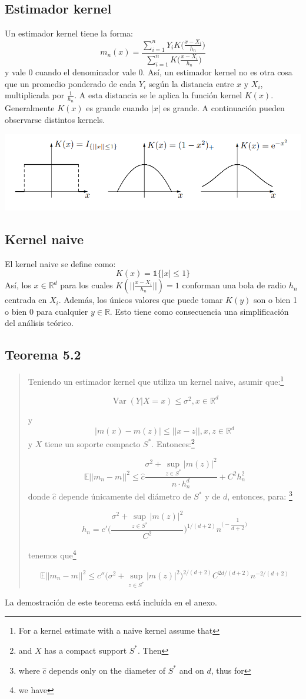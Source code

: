 \documentclass[12pt, a4paper]{article}
\begin{document}
\subsection{Estimador kernel}
Un estimador kernel tiene la forma:
$$
m_n(x)=\frac{\sum_{i=1}^{n} Y_i K \big( \frac{x-X_i}{h_n} \big)}{\sum_{i=1}^{n} K \big( \frac{x-X_i}{h_n} \big)}
$$
y vale 0 cuando el denominador vale 0. Así, un estimador kernel no es otra cosa que un promedio ponderado de cada $Y_i$ según la distancia entre $x$ y $X_i$, multiplicada por $\frac{1}{h_n}$. A esta distancia se le aplica la función kernel $K(x)$. Generalmente $K(x)$ es grande cuando $|x|$ es grande. A continuación pueden observarse distintos kernels.

\includegraphics[width=\textwidth]{graficos_kernel}
\subsection{Kernel naive}
El kernel naive se define como:
$$
K(x)=\mathds{1}\{ |x|\leq1 \}
$$
Así, los $x\in\mathds{R}^d$ para los cuales $K(||\frac{x-X_i}{h_n}||)=1$ conforman una bola de radio $h_n$ centrada en $X_i$. Además, los únicos valores que puede tomar $K(y)$ son o bien 1 o bien 0 para cualquier $y\in\mathds{R}$. Esto tiene como consecuencia una simplificación del análisis teórico.
\subsection{Teorema 5.2}

\begin{quotation}
Teniendo un estimador kernel que utiliza un kernel naive, asumir que:\footnote{For a kernel estimate with a naive kernel assume that}

$$
\mathop{Var}(Y|X=x)\leq \sigma^2 ,x \in \mathds{R}^d
$$

y
$$
|m(x)-m(z)|\leq||x-z||, x,z \in \mathds{R}^d
$$
y $X$ tiene un soporte compacto $S^{*}$. Entonces:\footnote{and $X$ has a compact support $S^{*}$. Then}

$$
\mathds{E}|| m_n -m ||^2 \leq \hat{c} \dfrac{ \sigma^2 + \mathop{sup}_{z\in S^{*}} |m(z)|^2 }{n \cdot h_n^d} +C^2h_n^2
$$
donde $\hat{c}$ depende únicamente del diámetro de $S^{*}$ y de $d$, entonces, para: \footnote{where $\hat{c}$ depends only on the diameter of $S^{*}$ and on $d$, thus for}

$$
h_n = c' \Bigg( \dfrac{\sigma^2 + \mathop{sup}_{z\in S^{*}}|m(z)|^2 }{C^2} \Bigg)^{1/(d+2)} n^{\Big (-\dfrac{1}{d+2}\Big )}
$$

tenemos que\footnote{we have}

$$
\mathds{E}|| m_n - m ||^2 \leq c'' \Bigg (  \sigma^2 + \mathop{sup}_{z\in S^{*}} |m(z)|^2 \Bigg )^{2/(d+2)} C^{2d/(d+2)} n^{-2/(d+2)}
$$

\end{quotation}
La demostración de este teorema está incluída en el anexo.
\end{document}
